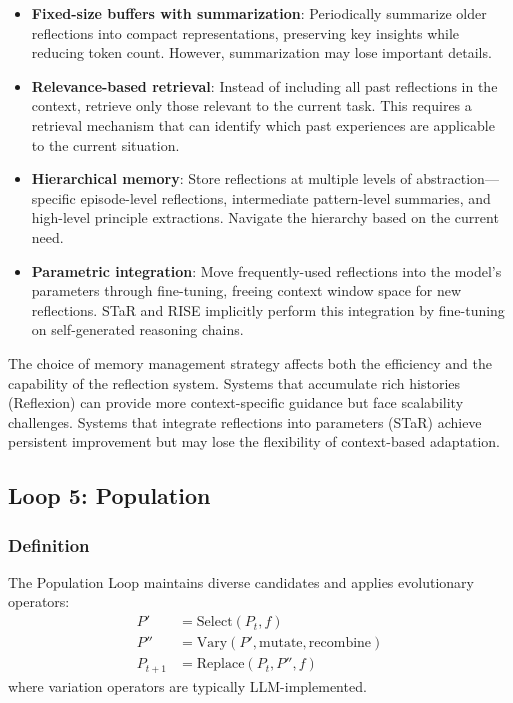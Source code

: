 \begin{itemize}
    \item \textbf{Fixed-size buffers with summarization}: Periodically summarize older reflections into compact representations, preserving key insights while reducing token count. However, summarization may lose important details.

    \item \textbf{Relevance-based retrieval}: Instead of including all past reflections in the context, retrieve only those relevant to the current task. This requires a retrieval mechanism that can identify which past experiences are applicable to the current situation.

    \item \textbf{Hierarchical memory}: Store reflections at multiple levels of abstraction---specific episode-level reflections, intermediate pattern-level summaries, and high-level principle extractions. Navigate the hierarchy based on the current need.

    \item \textbf{Parametric integration}: Move frequently-used reflections into the model's parameters through fine-tuning, freeing context window space for new reflections. STaR and RISE implicitly perform this integration by fine-tuning on self-generated reasoning chains.
\end{itemize}

The choice of memory management strategy affects both the efficiency and the capability of the reflection system. Systems that accumulate rich histories (Reflexion) can provide more context-specific guidance but face scalability challenges. Systems that integrate reflections into parameters (STaR) achieve persistent improvement but may lose the flexibility of context-based adaptation.


\subsection{Loop 5: Population}
\label{sec:population-loop}

\subsubsection{Definition}

The Population Loop maintains diverse candidates and applies evolutionary operators:
\begin{align}
    P' &= \text{Select}(P_t, f) \\
    P'' &= \text{Vary}(P', \text{mutate}, \text{recombine}) \\
    P_{t+1} &= \text{Replace}(P_t, P'', f)
\end{align}
where variation operators are typically LLM-implemented.


